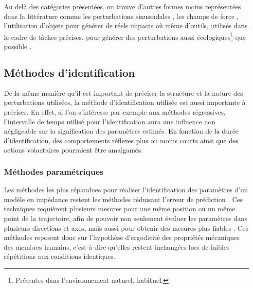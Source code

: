 Au delà des catégories présentées, on trouve d'autres formes moins représentées dans la littérature comme les perturbations sinusoïdales \parencite{bennett_catching_1994,hondori_perturbation-based_2010}, les champs de force \parencite{burdet_central_2001,franklin_adaptation_2003}, l'utilisation d'objets pour générer de réels impacts \parencite{lee_simple_2017} où même d'outils, utilisés dans le cadre de tâches précises, pour générer des perturbations aussi écologiques\textcolor{black}{\footnote{Présentes dans l'environnement naturel, habituel.}} que possible \parencite{phan_estimating_2020}.

\subsection{Méthodes d'identification} \label{chap3_sec_st_art_sub_ident}

De la même manière qu'il est important de préciser la structure et la nature des perturbations utilisées, la méthode d'identification utilisée est aussi importante à préciser. En effet, si l'on s'intéresse par exemple aux méthodes régressives, l'intervalle de temps utilisé pour l'identification aura une influence non négligeable sur la signification des paramètres estimés. \textcolor{black}{En fonction de la durée d'identification, des comportements réflexes plus ou moins courts ainsi que des actions volontaires pourraient être amalgamés.}

\subsubsection{Méthodes paramétriques} \label{chap3_sec_st_art_sub_ident_1}

Les méthodes les plus répandues pour réaliser l'identification des paramètres d'un modèle en impédance restent les %
méthodes réduisant l'erreur de prédiction \parencite{mussa-ivaldi_neural_1985,dolan_dynamic_1993,tsuji_human_1995,gomi_human_1997,burdet_method_2000,erden_end-point_2015,borner_estimation_2020}. Ces techniques requièrent plusieurs mesures pour une même position ou un même point de la trajectoire, afin de pouvoir non seulement évaluer les paramètres dans plusieurs directions et axes, mais aussi pour obtenir des mesures plus fiables \parencite{piovesan_measuring_2012}. Ces méthodes reposent donc sur l'hypothèse d'ergodicité des propriétés mécaniques des membres humains, c'est-à-dire qu'elles restent inchangées lors de faibles répétitions aux conditions identiques.

